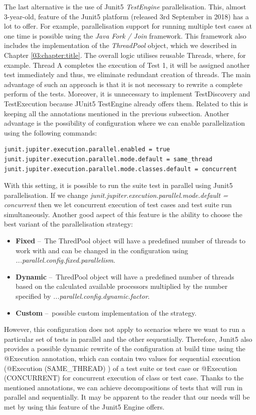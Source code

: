 The last alternative is the use of Junit5 \emph{TestEngine} parallelisation.
This, almost 3-year-old, feature of the Junit5 platform (released 3rd September in 2018) has a lot to offer.
For example, parallelisation support for running multiple test cases at one time is possible using the \emph{Java Fork / Join} framework.
This framework also includes the implementation of the \emph{ThreadPool} object, which we described in Chapter \ref{03:chapter:title}.
The overall logic utilises reusable Threads, where, for example.
Thread A completes the execution of Test 1, it will be assigned another test immediately and thus, we eliminate redundant creation of threads.
The main advantage of such an approach is that it is not necessary to rewrite a complete perform of the tests.
Moreover, it is unnecessary to implement TestDiscovery and TestExecution because JUnit5 TestEngine already offers them.
Related to this is keeping all the annotations mentioned in the previous subsection.
Another advantage is the possibility of configuration where we can enable parallelization using the following commands:
\begin{verbatim}
junit.jupiter.execution.parallel.enabled = true
junit.jupiter.execution.parallel.mode.default = same_thread
junit.jupiter.execution.parallel.mode.classes.default = concurrent
\end{verbatim}
With this setting, it is possible to run the suite test in parallel using Junit5 parallelisation.
If we change \emph{junit.jupiter.execution.parallel.mode.default = concurrent} then we let concurrent execution of test cases and test suite run simultaneously.
Another good aspect of this feature is the ability to choose the best variant of the parallelisation strategy:
\begin{itemize}[itemsep=1mm, parsep=0pt]
    \item \textbf{Fixed} \---\ The ThredPool object will have a predefined number of threads to work with and can be changed in the configuration using \emph{...parallel.config.fixed.parallelism}.
    \item \textbf{Dynamic} \---\ ThredPool object will have a predefined number of threads based on the calculated available processors multiplied by the number specified by \emph {...parallel.config.dynamic.factor}.
    \item \textbf{Custom} \---\ possible custom implementation of the strategy.
\end{itemize}
However, this configuration does not apply to scenarios where we want to run a particular set of tests in parallel and the other sequentially.
Therefore, Junit5 also provides a possible dynamic rewrite of the configuration at build time using the @Execution annotation, which can contain two values for sequential execution (@Execution (SAME\_THREAD) ) of a test suite or test case or @Execution (CONCURRENT) for concurrent execution of class or test case.
Thanks to the mentioned annotations, we can achieve decompositions of tests that will run in parallel and sequentially.
It may be apparent to the reader that our needs will be met by using this feature of the Junit5 Engine offers.

